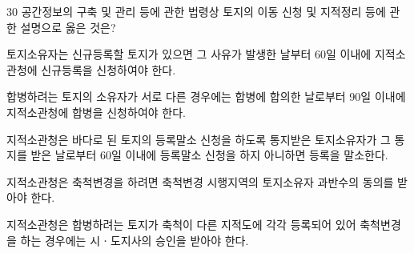 \begin{question}{30}
공간정보의 구축 및 관리 등에 관한 법령상 토지의 이동 신청 및 지적정리 등에 관한 설명으로 옳은 것은?
\begin{choices}
  \item 토지소유자는 신규등록할 토지가 있으면 그 사유가 발생한 날부터 60일 이내에 지적소관청에 신규등록을 신청하여야 한다.
  \item 합병하려는 토지의 소유자가 서로 다른 경우에는 합병에 합의한 날로부터 90일 이내에 지적소관청에 합병을 신청하여야 한다.
  \item 지적소관청은 바다로 된 토지의 등록말소 신청을 하도록 통지받은 토지소유자가 그 통지를 받은 날로부터 60일 이내에 등록말소 신청을 하지 아니하면 등록을 말소한다.
  \item 지적소관청은 축척변경을 하려면 축척변경 시행지역의 토지소유자 과반수의 동의를 받아야 한다.
  \item 지적소관청은 합병하려는 토지가 축척이 다른 지적도에 각각 등록되어 있어 축척변경을 하는 경우에는 시ㆍ도지사의 승인을 받아야 한다.
\end{choices}
\end{question}
